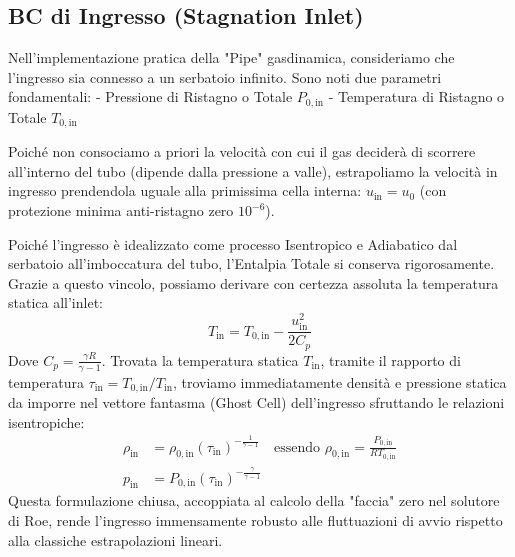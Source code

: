 \documentclass[11pt,a4paper]{article}
\begin{document}
\subsection{BC di Ingresso (Stagnation Inlet)}
Nell'implementazione pratica della "Pipe" gasdinamica, consideriamo che l'ingresso sia connesso a un serbatoio infinito. Sono noti due parametri fondamentali:
- Pressione di Ristagno o Totale $P_{0, \text{in}}$
- Temperatura di Ristagno o Totale $T_{0, \text{in}}$

Poiché non consociamo a priori la velocità con cui il gas deciderà di scorrere all'interno del tubo (dipende dalla pressione a valle), estrapoliamo la velocità in ingresso prendendola uguale alla primissima cella interna: $u_{\text{in}} = u_0$ (con protezione minima anti-ristagno zero $10^{-6}$).

Poiché l'ingresso è idealizzato come processo Isentropico e Adiabatico dal serbatoio all'imboccatura del tubo, l'Entalpia Totale si conserva rigorosamente. Grazie a questo vincolo, possiamo derivare con certezza assoluta la temperatura statica all'inlet:
\begin{equation}
T_{\text{in}} = T_{0, \text{in}} - \frac{u_{\text{in}}^2}{2 C_p}
\end{equation}
Dove $C_p = \frac{\gamma R}{\gamma - 1}$. 
Trovata la temperatura statica $T_{\text{in}}$, tramite il rapporto di temperatura $\tau_{\text{in}} = T_{0, \text{in}} / T_{\text{in}}$, troviamo immediatamente densità e pressione statica da imporre nel vettore fantasma (Ghost Cell) dell'ingresso sfruttando le relazioni isentropiche:
\begin{align}
\rho_{\text{in}} &= \rho_{0, \text{in}} \left( \tau_{\text{in}} \right)^{-\frac{1}{\gamma-1}} \quad \text{essendo } \rho_{0,\text{in}} = \frac{P_{0,\text{in}}}{R T_{0,\text{in}}} \\
p_{\text{in}} &= P_{0, \text{in}} \left( \tau_{\text{in}} \right)^{-\frac{\gamma}{\gamma-1}}
\end{align}
Questa formulazione chiusa, accoppiata al calcolo della "faccia" zero nel solutore di Roe, rende l'ingresso immensamente robusto alle fluttuazioni di avvio rispetto alla classiche estrapolazioni lineari.
\end{document}

